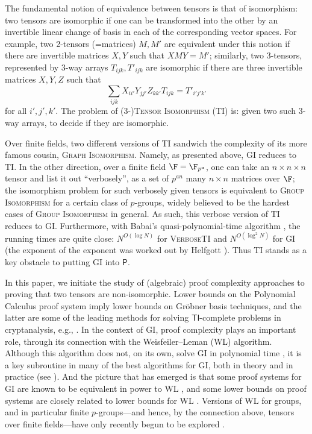 The fundamental notion of equivalence between tensors is that of isomorphism: two tensors are isomorphic if one can be transformed into the other by an invertible linear change of basis in each of the corresponding vector spaces. For example, two 2-tensors (=matrices) $M,M'$ are equivalent under this notion if there are invertible matrices $X,Y$ such that $XMY = M'$; similarly, two 3-tensors, represented by 3-way arrays $T_{ijk}, T'_{ijk}$ are isomorphic if there are three invertible matrices $X,Y,Z$ such that 
\begin{equation} \label{eq:TI}
\sum_{ijk} X_{ii'} Y_{jj'} Z_{kk'} T_{ijk} = T'_{i'j'k'}
\end{equation}
for all $i',j',k'$. The problem of (3-)\textsc{Tensor Isomorphism} (\textsc{TI}) is: given two such 3-way arrays, to decide if they are isomorphic. 

Over finite fields, two different versions of \textsc{TI} sandwich the complexity of its more famous cousin, \textsc{Graph Isomorphism}. Namely, as presented above, \textsc{GI} reduces to \textsc{TI}. In the other direction, over a finite field $\F=\F_{p^a}$, one can take an $n \times n \times n$ tensor and list it out ``verbosely'', as a set of $p^{an}$ many $n \times n$ matrices over $\F$; the isomorphism problem for such verbosely given tensors is equivalent to \textsc{Group Isomorphism} for a certain class of $p$-groups, widely believed to be the hardest cases of \textsc{Group Isomorphism} in general. As such, this verbose version of \textsc{TI} reduces to \textsc{GI}. Furthermore, with Babai's quasi-polynomial-time algorithm \cite{Babai}, the running times are quite close: $N^{O(\log N)}$ for \textsc{VerboseTI} and $N^{O(\log^2 N)}$ for \textsc{GI} (the exponent of the exponent was worked out by Helfgott \cite{helfgott}). Thus \textsc{TI} stands as a key obstacle to putting \textsc{GI} into $\mathsf{P}$.


In this paper, we initiate the study of (algebraic) proof complexity approaches to proving that two tensors are non-isomorphic.
Lower bounds on the Polynomial Calculus proof system imply lower bounds on Gr\"{o}bner basis techniques, and the latter are some of the leading methods for solving $\mathsf{TI}$-complete problems in cryptanalysis, e.g., \cite{DBLP:conf/eurocrypt/TangDJPQS22, DBLP:conf/eurocrypt/FaugereP06}.
In the context of \textsc{GI}, proof complexity plays an important role, through its connection with the Weisfeiler--Leman (WL) algorithm. Although this algorithm does not, on its own, solve \textsc{GI} in polynomial time \cite{CFI}, it is a key subroutine in many of the best algorithms for \textsc{GI}, both in theory \cite{Babai} and in practice (see \cite{mckay, MP}). And the picture that has emerged is that some proof systems for \textsc{GI} are known to be equivalent in power to WL \cite{AM, BerkholzG15}, and some lower bounds on proof systems are closely related to lower bounds for WL \cite{SSC, DBLP:conf/soda/ODonnellWWZ14, BerkholzG15}. Versions of WL for groups, and in particular finite $p$-groups---and hence, by the connection above, tensors over finite fields---have only recently begun to be explored \cite{BGLQW, BS1, BS2, CL}.


